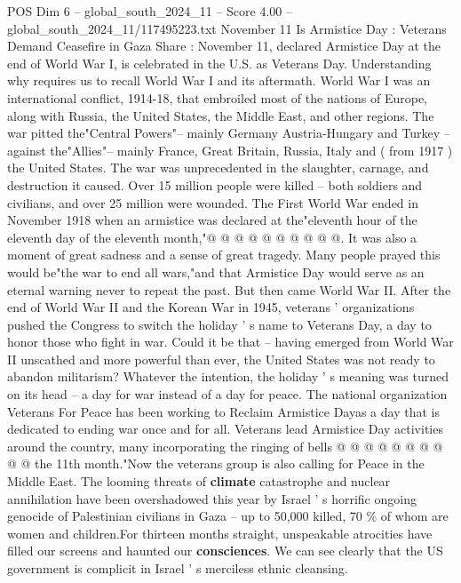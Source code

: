 \begin{textsample}{POS Dim 6 – global\_south\_2024\_11 – Score 4.00 – global\_south\_2024\_11/117495223.txt}  \label{ex:f6_pos_391}
November 11 Is Armistice Day : Veterans Demand Ceasefire in Gaza Share : November 11, declared Armistice Day at the end of World War I, is celebrated in the U.S. as Veterans Day.
Understanding why requires us to recall World War I and its aftermath.
World War I was an international conflict, 1914-18, that embroiled most of the nations of Europe, along with Russia, the United States, the Middle East, and other regions.
The war pitted the"Central Powers"-- mainly Germany Austria-Hungary and Turkey -- against the"Allies"-- mainly France, Great Britain, Russia, Italy and ( from 1917 ) the United States.
The war was unprecedented in the slaughter, carnage, and destruction it caused.
Over 15 million people were killed -- both soldiers and civilians, and over 25 million were wounded.
The First World War ended in November 1918 when an armistice was declared at the"eleventh hour of the eleventh day of the eleventh month,"@ @ @ @ @ @ @ @ @ @.
It was also a moment of great sadness and a sense of great tragedy.
Many people prayed this would be"the war to end all wars,"and that Armistice Day would serve as an eternal warning never to repeat the past.
But then came World War II.
After the end of World War II and the Korean War in 1945, veterans ' organizations pushed the Congress to switch the holiday ' s name to Veterans Day, a day to honor those who fight in war.
Could it be that -- having emerged from World War II unscathed and more powerful than ever, the United States was not ready to abandon militarism?
Whatever the intention, the holiday ' s meaning was turned on its head -- a day for war instead of a day for peace.
The national organization Veterans For Peace has been working to Reclaim Armistice Dayas a day that is dedicated to ending war once and for all.
Veterans lead Armistice Day activities around the country, many incorporating the ringing of bells @ @ @ @ @ @ @ @ @ @ the 11th month."Now the veterans group is also calling for Peace in the Middle East.
The looming threats of \textbf{climate} catastrophe and nuclear annihilation have been overshadowed this year by Israel ' s horrific ongoing genocide of Palestinian civilians in Gaza -- up to 50,000 killed, 70 \% of whom are women and children.For thirteen months straight, unspeakable atrocities have filled our screens and haunted our \textbf{consciences}.
We can see clearly that the US government is complicit in Israel ' s merciless ethnic cleansing.

\end{textsample}
